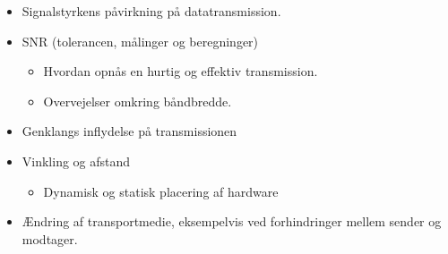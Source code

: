 \begin{itemize}[noitemsep]
  \item Signalstyrkens påvirkning på datatransmission.
  \item SNR (tolerancen, målinger og beregninger)
  \begin{itemize}[noitemsep]
  \item Hvordan opnås en hurtig og effektiv transmission.
  \item Overvejelser omkring båndbredde.
  \end{itemize}
  \item Genklangs inflydelse på transmissionen
  \item Vinkling og afstand
  \begin{itemize}[noitemsep]
  \item Dynamisk og statisk placering af hardware
  \end{itemize}
  \item Ændring af transportmedie, eksempelvis ved forhindringer mellem sender og modtager.
\end{itemize}

